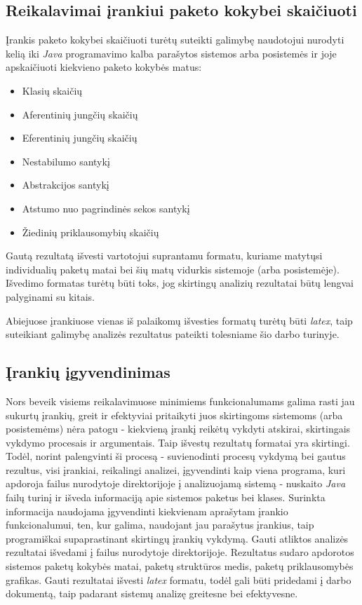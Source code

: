 \subsection{Reikalavimai įrankiui paketo kokybei skaičiuoti}
Įrankis paketo kokybei skaičiuoti turėtų suteikti galimybę naudotojui nurodyti kelią iki \textit{Java} programavimo kalba parašytos sistemos arba posistemės ir joje
apskaičiuoti kiekvieno paketo kokybės matus:
\begin{itemize}
    \item Klasių skaičių
    \item Aferentinių jungčių skaičių
    \item Eferentinių jungčių skaičių
    \item Nestabilumo santykį
    \item Abstrakcijos santykį
    \item Atstumo nuo pagrindinės sekos santykį
    \item Žiedinių priklausomybių skaičių
\end{itemize}
Gautą rezultatą išvesti vartotojui suprantamu formatu, kuriame matytųsi individualių paketų matai bei šių matų vidurkis sistemoje (arba posistemėje).
Išvedimo formatas turėtų būti toks, jog skirtingų analizių rezultatai būtų lengvai palyginami su kitais.

Abiejuose įrankiuose vienas iš palaikomų išvesties formatų turėtų būti \textit{latex}, taip suteikiant galimybę analizės rezultatus pateikti tolesniame šio darbo turinyje.

\subsection{Įrankių įgyvendinimas}
Nors beveik visiems reikalavimuose minimiems funkcionalumams galima rasti jau sukurtų įrankių, greit ir efektyviai pritaikyti juos skirtingoms sistemoms
(arba posistemėms) nėra patogu - kiekvieną įrankį reikėtų vykdyti atskirai, skirtingais vykdymo procesais ir argumentais.
Taip išvestų rezultatų formatai yra skirtingi.
Todėl, norint palengvinti ši procesą - suvienodinti procesų vykdymą bei gautus rezultus, visi įrankiai, reikalingi analizei, įgyvendinti kaip viena programa, kuri
apdoroja failus nurodytoje direktorijoje į analizuojamą sistemą - nuskaito \textit{Java} failų turinį ir išveda informaciją apie sistemos paketus bei klases.
Surinkta informacija naudojama įgyvendinti kiekvienam aprašytam įrankio funkcionalumui, ten, kur galima, naudojant jau parašytus įrankius, taip programiškai supaprastinant
skirtingų įrankių vykdymą.
Gauti atliktos analizės rezultatai išvedami į failus nurodytoje direktorijoje.
Rezultatus sudaro apdorotos sistemos paketų kokybės matai, paketų struktūros medis, paketų priklausomybės grafikas.
Gauti rezultatai išvesti \textit{latex} formatu, todėl gali būti pridedami į darbo dokumentą, taip padarant sistemų analizę greitesne bei efektyvesne.


